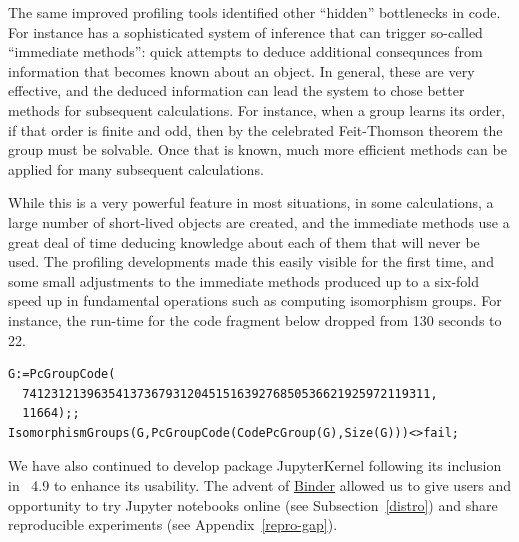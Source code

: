 \documentclass{deliverablereport}
\begin{document}
The same improved profiling tools identified other
``hidden'' bottlenecks in \GAP code. For instance \GAP has a
sophisticated system of inference that can trigger 
so-called ``immediate methods'': quick attempts to deduce additional
consequnces from information that becomes known about an object.
In general, these are very effective, and the deduced information can
lead the system to chose better methods for subsequent
calculations. For instance, when a group learns its order, if that
order is finite and odd, then by the celebrated
Feit-Thomson theorem the group must be solvable. Once that
is known, much more efficient methods can be applied for many
subsequent calculations.

While this is a very powerful feature in most situations, in some
calculations, a large number of short-lived objects are created,
and the immediate methods use a great deal of time deducing knowledge
about each of them
that will never be used. The profiling developments made this 
easily visible for the first time, and some small adjustments to the
immediate methods produced up to a six-fold speed up in fundamental
operations such as computing isomorphism groups. For instance, the
run-time for the code fragment below dropped from 130
seconds to 22.


{\Small
\begin{verbatim}
G:=PcGroupCode( 
  741231213963541373679312045151639276850536621925972119311,
  11664);;
IsomorphismGroups(G,PcGroupCode(CodePcGroup(G),Size(G)))<>fail;
\end{verbatim}
}


We have also continued to develop package {\sf JupyterKernel} following 
its inclusion in \GAP~4.9 to enhance its usability. The advent of
\href{https://mybinder.org/}{Binder} allowed us to give users and 
opportunity to try \GAP Jupyter notebooks online (see Subsection~\ref{distro})
and share reproducible \GAP experiments (see Appendix~\ref{repro-gap}).
\end{document}
